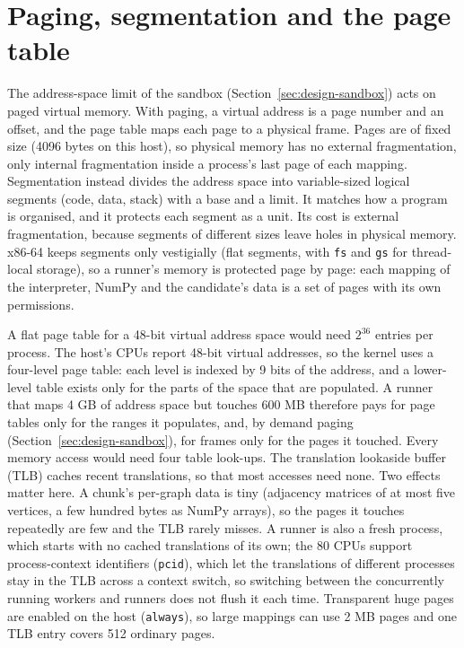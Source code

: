 \section{Paging, segmentation and the page table}

The address-space limit of the sandbox (Section~\ref{sec:design-sandbox}) acts
on paged virtual memory. With paging, a virtual address is a page number and an
offset, and the page table maps each page to a physical frame. Pages are of
fixed size (4096 bytes on this host), so physical memory has no external
fragmentation, only internal fragmentation inside a process's last page of each
mapping. Segmentation instead divides the address space into variable-sized
logical segments (code, data, stack) with a base and a limit. It matches how a
program is organised, and it protects each segment as a unit. Its cost is
external fragmentation, because segments of different sizes leave holes in
physical memory. x86-64 keeps segments only vestigially (flat segments, with
\texttt{fs} and \texttt{gs} for thread-local storage), so a runner's memory is
protected page by page: each mapping of the interpreter, NumPy and the
candidate's data is a set of pages with its own permissions.

A flat page table for a 48-bit virtual address space would need $2^{36}$
entries per process. The host's CPUs report 48-bit virtual addresses, so the
kernel uses a four-level page table: each level is indexed by 9 bits of the
address, and a lower-level table exists only for the parts of the space that
are populated. A runner that maps 4 GB of address space but touches 600 MB
therefore pays for page tables only for the ranges it populates, and, by demand
paging (Section~\ref{sec:design-sandbox}), for frames only for the pages it
touched. Every memory access would need four table look-ups. The translation
lookaside buffer (TLB) caches recent translations, so that most accesses need
none. Two effects matter here. A chunk's per-graph data is tiny (adjacency
matrices of at most five vertices, a few hundred bytes as NumPy arrays), so the
pages it touches repeatedly are few and the TLB rarely misses. A runner is also
a fresh process, which starts with no cached translations of its own; the 80
CPUs support process-context identifiers (\texttt{pcid}), which let the
translations of different processes stay in the TLB across a context switch, so
switching between the concurrently running workers and runners does not flush
it each time. Transparent huge pages are enabled on the host (\texttt{always}), so
large mappings can use 2 MB pages and one TLB entry covers 512 ordinary pages.

